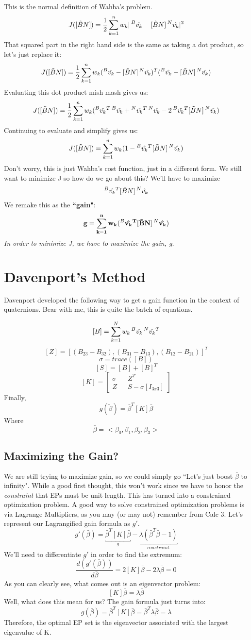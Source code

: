 \documentclass[a4paper,14pt]{extreport}
\newcommand{\vk}[1]{\prescript{#1}{}{\hat{v_k}}}
\begin{document}
This is the normal definition of Wahba's problem.
\[
J([\tilde{B}N]) = \dfrac{1}{2} \sum^n_{k=1} w_k |\vk{B} - [\tilde{B}N]\vk{N}|^2
\]
That squared part in the right hand side is the same as taking a dot product, so let's just replace it:
\[
J([\tilde{B}N]) = \dfrac{1}{2} \sum^n_{k=1} w_k (\vk{B} - [\tilde{B}N]\vk{N})^T(\vk{B} - [\tilde{B}N]\vk{N})
\]
Evaluating this dot product mish mash gives us:
\[
J([\tilde{B}N]) = \dfrac{1}{2} \sum^n_{k=1} w_k (\vk{B}^T\vk{B}+\vk{N}^T\vk{N}-2\vk{B}^T[\tilde{B}N]\vk{N})
\]
Continuing to evaluate and simplify gives us:
\[
J([\tilde{B}N]) = \sum^n_{k=1} w_k (1- \vk{B}^T[\tilde{B}N]\vk{N})
\]
Don't worry, this is just Wahba's cost function, just in a different form. We still want to minimize J so how do we go about this? We'll have to maximize $$\vk{B}^T[\tilde{B}N]\vk{N}$$ We remake this as the \textbf{``gain"}:
\[
\mathbf{
g = \sum^n_{k=1} w_k (\vk{B}^T[\tilde{B}N]\vk{N})}
\]
\emph{In order to minimize J, we have to maximize the gain, g.}

\section{Davenport's Method}
Davenport developed the following way to get a gain function in the context of quaternions. Bear with me, this is quite the batch of equations.

\[
[B] = \sum^N_{k=1} w_k\vk{B}\vk{N}^T
\]
\[
[Z] = [(B_{23}-B_{32}), (B_{31}-B_{13}), (B_{12}-B_{21})]^T
\]
\[
\sigma = trace([B])
\]
\[
[S] = [B]+[B]^T
\]
\[
[K] =
\begin{bmatrix}
\sigma && Z^T \\ Z && S-\sigma  [I_{3x3}]
\end{bmatrix}
\]
Finally,
\[
g(\tilde{\beta}) = \bar{\beta}^T[K]\bar{\beta}
\]
Where
\[\bar{\beta} = <\beta_0,\beta_1,\beta_2,\beta_3>\]
\subsection{Maximizing the Gain?}
We are still trying to maximize gain, so we could simply go ``Let's just boost $\bar{\beta}$ to infinity". While a good first thought, this won't work since we have to honor the \emph{constraint} that EPs must be unit length. This has turned into a constrained optimization problem. A good way to solve constrained optimization problems is via Lagrange Multipliers, as you may (or may not) remember from Calc 3. Let's represent our Lagrangified gain formula as $g'$.
\[
g'(\bar{\beta}) = \underbracket{\bar{\beta}^T[K]\bar{\beta}}_{g} - \underbracket{\lambda(\bar{\beta}^T\bar{\beta}-1)}_{constraint}
\]
We'll need to differentiate $g'$ in order to find the extremum:
\[
\dfrac{d(g'(\bar{\beta}))}{d\bar{\beta}} = 2[K]\bar{\beta} - 2\lambda\bar{\beta}=0
\]
As you can clearly see, what comes out is an eigenvector problem:
\[
[K]\bar{\beta}=\lambda\bar{\beta}
\]
Well, what does this mean for us? The gain formula just turns into:
\[
g(\bar{\beta}) = \bar{\beta}^T[K]\bar{\beta} = \bar{\beta}^T\lambda\bar{\beta} = \lambda
\]Therefore, the optimal EP set is the eigenvector associated with the largest eigenvalue of K.
\end{document}
